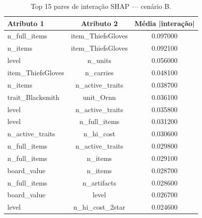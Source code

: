 \begin{table}[htbp]
\caption{Top 15 pares de interação SHAP — cenário B.}
\label{tab:intertB}
\centering
\small
\begin{tabular}{lcc}
\toprule
Atributo 1 & Atributo 2 & Média |interação| \\
\midrule
n\_full\_items & item\_ThiefsGloves & 0.097000 \\
n\_items & item\_ThiefsGloves & 0.092100 \\
level & n\_units & 0.056000 \\
item\_ThiefsGloves & n\_carries & 0.048100 \\
n\_items & n\_active\_traits & 0.038700 \\
trait\_Blacksmith & unit\_Ornn & 0.036100 \\
level & n\_active\_traits & 0.035800 \\
level & n\_full\_items & 0.031200 \\
n\_active\_traits & n\_hi\_cost & 0.030600 \\
n\_full\_items & n\_active\_traits & 0.029800 \\
n\_full\_items & n\_items & 0.029100 \\
board\_value & n\_items & 0.028700 \\
n\_full\_items & n\_artifacts & 0.028600 \\
board\_value & level & 0.026700 \\
level & n\_hi\_cost\_2star & 0.024600 \\
\bottomrule
\end{tabular}
\end{table}
